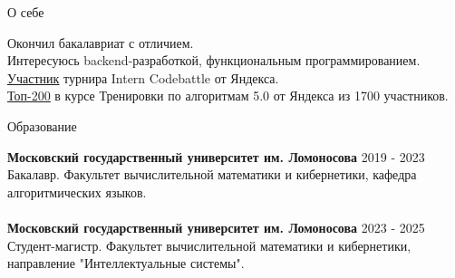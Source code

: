 \documentclass{resume} %
\begin{document}

\begin{rSection}{О себе}

{Окончил бакалавриат с отличием. } \\
{Интересуюсь backend-разработкой, функциональным программированием.}  \\
{\href{https://github.com/tymillnyc/aboutme/blob/main/proofs/codebattle_ydx.pdf} 
{\underline{Участник}} турнира \textquotedbl{}Intern Codebattle\textquotedbl{} от Яндекса.} \\ 
{\href{https://github.com/tymillnyc/aboutme/blob/main/proofs/train5_ydx.pdf}
{\underline{Топ-200}} в курсе \textquotedbl{}Тренировки по алгоритмам 5.0\textquotedbl{} от Яндекса из 1700 участников.}


\end{rSection}

\begin{rSection}{Образование}

{\bf Московский государственный университет им. Ломоносова}  \hfill {2019 - 2023} \\
{ Бакалавр. Факультет вычислительной математики и кибернетики, кафедра алгоритмических языков.} \\ \\
{\bf Московский государственный университет им. Ломоносова}  \hfill {2023 - 2025} \\
{ Студент-магистр. Факультет вычислительной математики и кибернетики, направление "Интеллектуальные системы".} 

\end{rSection}
\end{document}
